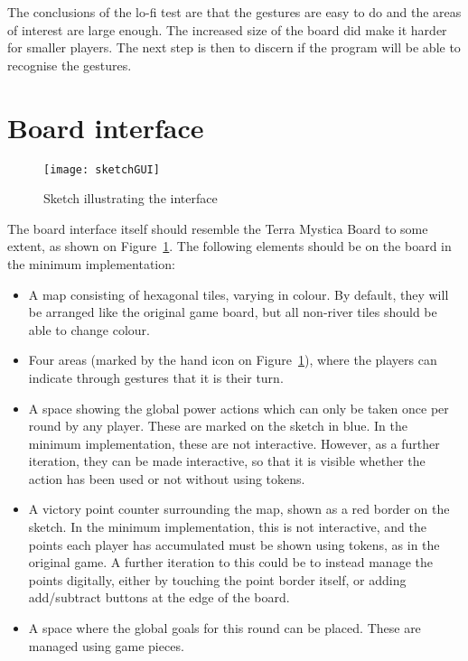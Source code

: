 The conclusions of the lo-fi test are that the gestures are easy to do and the areas of interest are large enough. The increased size of the board did make it harder for smaller players. The next step is then to discern if the program will be able to recognise the gestures. 

\section{Board interface}\label{sec:BoardInterface}
\begin{figure}
\centering
\texttt{[image: sketchGUI]}
\caption{Sketch illustrating the interface}
\label{fig:sketchGUI}
\end{figure}

The board interface itself should resemble the Terra Mystica Board to some extent, as shown on Figure~\ref{fig:sketchGUI}. The following elements should be on the board in the minimum implementation:
\begin{itemize}
\item A map consisting of hexagonal tiles, varying in colour. By default, they will be arranged like the original game board, but all non-river tiles should be able to change colour.
\item Four areas (marked by the hand icon on Figure~\ref{fig:sketchGUI}), where the players can indicate through gestures that it is their turn.
\item A space showing the global power actions which can only be taken once per round by any player. These are marked on the sketch in blue. In the minimum implementation, these are not interactive. However, as a further iteration, they can be made interactive, so that it is visible whether the action has been used or not without using tokens.
\item A victory point counter surrounding the map, shown as a red border on the sketch. In the minimum implementation, this is not interactive, and the points each player has accumulated must be shown using tokens, as in the original game. A further iteration to this could be to instead manage the points digitally, either by touching the point border itself, or adding add/subtract buttons at the edge of the board.
\item A space where the global goals for this round can be placed. These are managed using game pieces.
\end{itemize}

